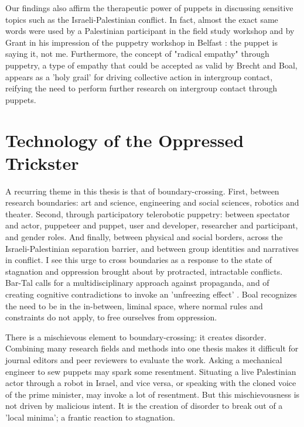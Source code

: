 \documentclass[dissertation,math,vertlayout,pdfa,colorlinks]{aaltoseries}
\begin{document}
Our findings also affirm the therapeutic power of puppets in discussing sensitive topics such as the Israeli-Palestinian conflict. In fact, almost the exact same words were used by a Palestinian participant in the field study workshop and by Grant in his impression of the puppetry workshop in Belfast \cite{grantObjectsObjectivesApplied2020}: the puppet is saying it, not me. Furthermore, the concept of "radical empathy" through puppetry, a type of empathy that could be accepted as valid by Brecht and Boal, appears as a 'holy grail' for driving collective action in intergroup contact, reifying the need to perform further research on intergroup contact through puppets.

\section{Technology of the Oppressed Trickster}
A recurring theme in this thesis is that of boundary-crossing. First, between research boundaries: art and science, engineering and social sciences, robotics and theater. Second, through participatory telerobotic puppetry: between spectator and actor, puppeteer and puppet, user and developer, researcher and participant, and gender roles. And finally, between physical and social borders, across the Israeli-Palestinian separation barrier, and between group identities and narratives in conflict. I see this urge to cross boundaries as a response to the state of stagnation and oppression brought about by protracted, intractable conflicts. Bar-Tal calls for a multidisciplinary approach against propaganda, and of creating cognitive contradictions to invoke an 'unfreezing effect' \cite{bar-talDanielBartalIsraelipalestinian2024}. Boal recognizes the need to be in the in-between, liminal space, where normal rules and constraints do not apply, to free ourselves from oppression. 

There is a mischievous element to boundary-crossing: it creates disorder. Combining many research fields and methods into one thesis makes it difficult for journal editors and peer reviewers to evaluate the work. Asking a mechanical engineer to sew puppets may spark some resentment. Situating a live Palestinian actor through a robot in Israel, and vice versa, or speaking with the cloned voice of the prime minister, may invoke a lot of resentment. But this mischievousness is not driven by malicious intent. It is the creation of disorder to break out of a 'local minima'; a frantic reaction to stagnation. 
\end{document}
